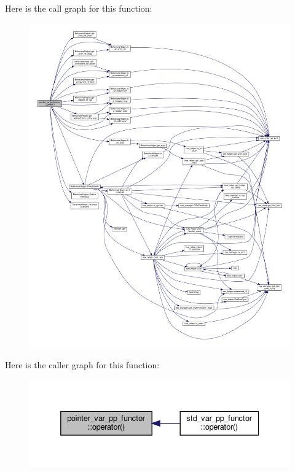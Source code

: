 Here is the call graph for this function\+:
\nopagebreak
\begin{figure}[H]
\begin{center}
\leavevmode
\includegraphics[width=350pt]{d3/dc1/structpointer__var__pp__functor_a89023532351352a1ce6a9d40d9ec5e2c_cgraph}
\end{center}
\end{figure}
Here is the caller graph for this function\+:
\nopagebreak
\begin{figure}[H]
\begin{center}
\leavevmode
\includegraphics[width=332pt]{d3/dc1/structpointer__var__pp__functor_a89023532351352a1ce6a9d40d9ec5e2c_icgraph}
\end{center}
\end{figure}


